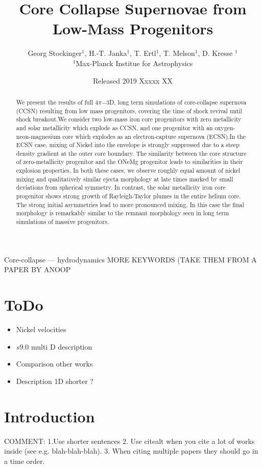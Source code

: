 \documentclass[fleqn,usenatbib]{mnras}
\title{Core Collapse Supernovae from Low-Mass Progenitors}
\author[G. Stockinger et. al]{Georg Stockinger$^1$, H.-T. Janka$^1$, T. Ertl$^1$, T. Melson$^1$, D. Kresse $^1$\\
$^1$Max-Planck Institue for Astrophysics}
\date{Released 2019 Xxxxx XX}
\newcommand{\NY}[2]{{\color{blue}\sout{#1}#2}}
\begin{document}
\maketitle
\pagerange{\pageref{firstpage}--\pageref{lastpage}} 

\begin{abstract}
We present the results of full $4\pi\mathord{-}$3D, long term simulations of core-collapse supernova (CCSN) resulting from low mass progenitors, covering the time of shock revival until shock breakout.We consider two low-mass iron core progenitors with zero metallicity and solar metallicity which explode as CCSN, and one progenitor with an oxygen-neon-magnesium core which explodes as an electron-capture supernova (ECSN).In the ECSN case, mixing of Nickel into the envelope is strongly suppressed due to a steep density gradient at the outer core boundary. The similarity between the core structure of zero-metallicity progenitor and the ONeMg progenitor leads to similarities in their explosion properties. In both these cases, we observe roughly equal amount of nickel mixing and qualitatively similar ejecta morphology at late times marked by small deviations from spherical symmetry. In contrast, the solar metallicity iron core progenitor shows strong growth of Rayleigh-Taylor plumes in the entire helium core. The strong initial asymmetries lead to more pronounced mixing. In this case the final morphology is remarkably similar to the remnant morphology seen in long term simulations of massive progenitors. 

\end{abstract}

\begin{keywords}
Core-collapse --- hydrodynamics
\NY{}{MORE KEYWORDS (TAKE THEM FROM A PAPER BY ANOOP}
\end{keywords}
\noindent

\section{ToDo}
\begin{itemize}
    \item Nickel velocities
    \item $s9.0$ multi D description
    \item Comparison other works
    \item Description 1D shorter ?
\end{itemize}

\section{Introduction}
\NY{}{COMMENT: 1.Use shorter sentences 2. Use citealt when you cite a lot of works inside (see e.g. blah-blah-blah). 3. When citing multiple papers they should go in a time order.}
\end{document}
